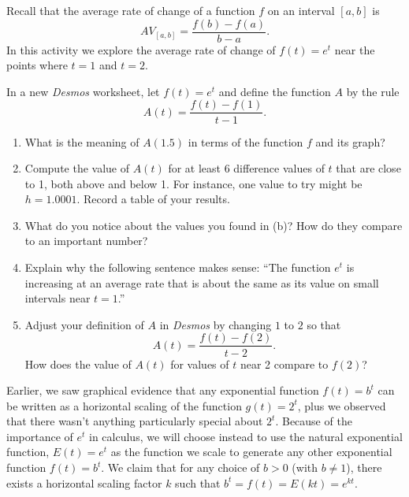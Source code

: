 \documentclass[nooutcomes]{ximera}
\begin{document}
\begin{exploration}
Recall that the average rate of change of a function \(f\) on an interval \([a,b]\) is%
\begin{equation*}
AV_{[a,b]} = \frac{f(b)-f(a)}{b-a}\text{.}
\end{equation*}
In this activity we explore the average rate of change of \(f(t) = e^t\) near the points where \(t = 1\) and \(t = 2\).%
\par
\hypertarget{p-1392}{}%
In a new \emph{Desmos} worksheet, let \(f(t) = e^t\) and define the function \(A\) by the rule%
\begin{equation*}
A(t) = \frac{f(t)-f(1)}{t-1}\text{.}
\end{equation*}
\begin{enumerate}[label=\alph*.]
\item What is the meaning of \(A(1.5)\) in terms of the function \(f\) and its graph?%
\item Compute the value of \(A(t)\) for at least \(6\) difference values of \(t\) that are close to 1, both above and below 1.  For instance, one value to try might be \(h = 1.0001\).  Record a table of your results.%
\item\hypertarget{li-634}{}\hypertarget{p-1396}{}%
What do you notice about the values you found in (b)?  How do they compare to an important number?%
\item\hypertarget{li-635}{}\hypertarget{p-1397}{}%
Explain why the following sentence makes sense: ``The function \(e^t\) is increasing at an average rate that is about the same as its value on small intervals near \(t = 1\).''%
\item\hypertarget{li-636}{}\hypertarget{p-1398}{}%
Adjust your definition of \(A\) in \emph{Desmos} by changing \(1\) to \(2\) so that%
\begin{equation*}
A(t) = \frac{f(t)-f(2)}{t-2}\text{.}
\end{equation*}
How does the value of \(A(t)\) for values of \(t\) near 2 compare to \(f(2)\)?%
\end{enumerate}

\end{exploration}



Earlier, we saw graphical evidence that any exponential function \(f(t) = b^t\) can be written as a horizontal scaling of the function \(g(t) = 2^t\), plus we observed that there wasn't anything particularly special about \(2^t\).    Because of the importance of \(e^t\) in calculus, we will choose instead to use the natural exponential function, 	\(E(t) = e^t\) as the function we scale to generate any other exponential function \(f(t) = b^t\).  We claim that for any choice of \(b \gt 0\) (with \(b \ne 1\)), there exists a horizontal scaling factor \(k\) such that \(b^t = f(t) = E(kt) = e^{kt}\).
\end{document}
